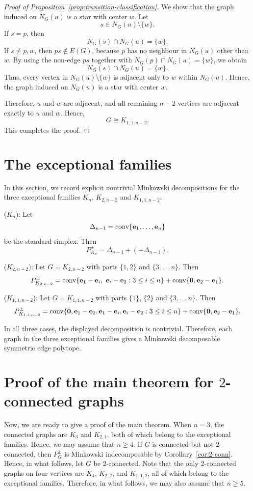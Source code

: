 \documentclass[11pt,a4paper]{amsart}
\theoremstyle{definition}
\theoremstyle{remark}
\newcommand{\conv}{\operatorname{conv}}
\newcommand{\eb}{{\bf e}}
\begin{document}
{\begin{proof}[Proof of Proposition~\ref{prop:transition-classification}]
We show that the graph induced on $N_G(u)$ is a star with center $w$. Let \[s\in N_G(u)\setminus\{w\}.\]
If $s=p$, then \[N_G(s)\cap N_G(u)=\{w\}.\]
If $s\ne p,w$, then $ps\notin E(G)$, because $p$ has no neighbour in $N_G(u)$ other than $w$. 
By using the non-edge $ps$ together with $N_G(p)\cap N_G(u)=\{w\}$, 
we obtain \[N_G(s)\cap N_G(u)=\{w\}.\]
Thus, every vertex in $N_G(u)\setminus\{w\}$ is adjacent only to $w$ within $N_G(u)$. 
Hence, the graph induced on $N_G(u)$ is a star with center $w$. 

Therefore, $u$ and $w$ are adjacent, and all remaining $n-2$ vertices are adjacent exactly to $u$ and $w$. 
Hence, \[G\cong K_{1,1,n-2}.\]
This completes the proof.
\end{proof}

\bigskip
\section{The exceptional families}\label{sec:exceptional}

In this section, we record explicit nontrivial Minkowski decompositions for the three exceptional families $K_n$, $K_{2,n-2}$ and $K_{1,1,n-2}$. 

\noindent
($K_n$): Let \[\Delta_{n-1}=\conv\{\eb_1,\ldots,\eb_n\}\] be the standard simplex. 
Then \[P_{K_n}^\pm=\Delta_{n-1}+(-\Delta_{n-1}). \] 


\noindent
($K_{2,n-2}$): Let $G=K_{2,n-2}$ with parts $\{1,2\}$ and $\{3,\ldots,n\}$. 
Then \[P_{K_{2,n-2}}^{\pm}=\conv\{\eb_1-\eb_i,\ \eb_i-\eb_2:3\le i\le n\}+\conv\{{\bf 0},\eb_2-\eb_1\}.\]


\noindent
($K_{1,1,n-2}$): Let $G=K_{1,1,n-2}$ with parts $\{1\}$, $\{2\}$ and $\{3,\ldots,n\}$. 
Then \[P_{K_{1,1,n-2}}^{\pm}=\conv\{{\bf 0},\eb_1-\eb_2,\eb_1-\eb_i,\eb_i-\eb_2:3\le i\le n\}+\conv\{{\bf 0},\eb_2-\eb_1\}. \]

\medskip

In all three cases, the displayed decomposition is nontrivial. 
Therefore, each graph in the three exceptional families gives a Minkowski decomposable symmetric edge polytope. 


\bigskip
\section{Proof of the main theorem for $2$-connected graphs}\label{sec:proof-main}

Now, we are ready to give a proof of the main theorem. 
When $n=3$, the connected graphs are $K_3$ and $K_{2,1}$, both of which belong to the exceptional families. Hence, we may assume that $n\ge4$.
If $G$ is connected but not $2$-connected, then $P_G^\pm$ is Minkowski indecomposable by Corollary~\ref{cor:2-conn}. 
Hence, in what follows, let $G$ be $2$-connected. 
Note that the only $2$-connected graphs on four vertices are $K_4$, $K_{2,2}$, and $K_{1,1,2}$, all of which belong to the exceptional families.
Therefore, in what follows, we may also assume that $n\ge 5$.

}
\end{document}
